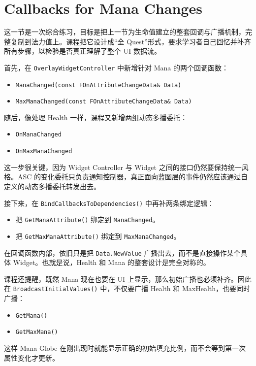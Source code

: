 \section{Callbacks for Mana Changes}

这一节是一次综合练习，目标是把上一节为生命值建立的整套回调与广播机制，完整复制到法力值上。课程把它设计成“全 Quest”形式，要求学习者自己回忆并补齐所有步骤，以检验是否真正理解了整个 UI 数据流。

首先，在 \texttt{OverlayWidgetController} 中新增针对 Mana 的两个回调函数：
\begin{itemize}
	\item \texttt{ManaChanged(const FOnAttributeChangeData\& Data)}
	\item \texttt{MaxManaChanged(const FOnAttributeChangeData\& Data)}
\end{itemize}

随后，像处理 Health 一样，课程又新增两组动态多播委托：
\begin{itemize}
	\item \texttt{OnManaChanged}
	\item \texttt{OnMaxManaChanged}
\end{itemize}

这一步很关键，因为 Widget Controller 与 Widget 之间的接口仍然要保持统一风格。ASC 的变化委托只负责通知控制器，真正面向蓝图层的事件仍然应该通过自定义的动态多播委托转发出去。

接下来，在 \texttt{BindCallbacksToDependencies()} 中再补两条绑定逻辑：
\begin{itemize}
	\item 把 \texttt{GetManaAttribute()} 绑定到 \texttt{ManaChanged}。
	\item 把 \texttt{GetMaxManaAttribute()} 绑定到 \texttt{MaxManaChanged}。
\end{itemize}

在回调函数内部，依旧只是把 \texttt{Data.NewValue} 广播出去，而不是直接操作某个具体 Widget。也就是说，Health 和 Mana 的整套设计是完全对称的。

课程还提醒，既然 Mana 现在也要在 UI 上显示，那么初始广播也必须补齐。因此在 \texttt{BroadcastInitialValues()} 中，不仅要广播 Health 和 MaxHealth，也要同时广播：
\begin{itemize}
	\item \texttt{GetMana()}
	\item \texttt{GetMaxMana()}
\end{itemize}

这样 Mana Globe 在刚出现时就能显示正确的初始填充比例，而不会等到第一次属性变化才更新。

